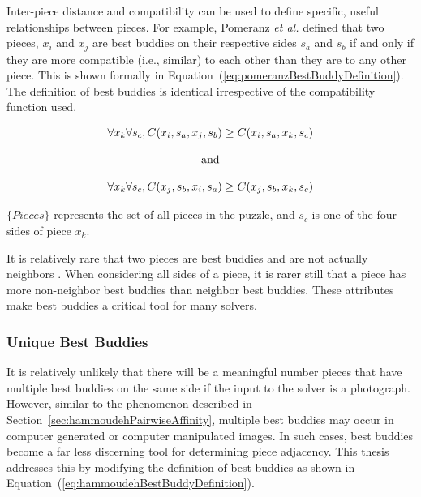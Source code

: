\documentclass{report}
\def\eref#1{(\ref{#1})}
\begin{document}
Inter-piece distance and compatibility can be used to define specific, useful relationships between pieces.  For example, Pomeranz \textit{et al.} defined that two pieces, $x_i$ and $x_j$ are best buddies on their respective sides $s_a$ and $s_b$ if and only if they are more compatible (i.e., similar) to each other than they are to any other piece.  This is shown formally in Equation~\eref{eq:pomeranzBestBuddyDefinition}.  The definition of best buddies is identical irrespective of the compatibility function used.

\begin{equation} \label{eq:pomeranzBestBuddyDefinition}
\centering
\begin{split}
	\begin{matrix}
		\forall{x_{k}}\forall{s_c},C(x_i, s_a, x_j, s_b) \geq C(x_i, s_a, x_k, s_c)
		\\
		\\
		\textnormal{and}
		\\
		\\
		\forall{x_{k}}\forall{s_c},C(x_j, s_b, x_i, s_a) \geq C(x_j, s_b, x_k, s_c)
	\end{matrix}
\end{split}
\end{equation}

\noindent
$\{Pieces\}$ represents the set of all pieces in the puzzle, and $s_c$ is one of the four sides of piece $x_k$.

It is relatively rare that two pieces are best buddies and are not actually neighbors \cite{paikin2015}.  When considering all sides of a piece, it is rarer still that a piece has more non-neighbor best buddies than neighbor best buddies.  These attributes make best buddies a critical tool for many solvers.

\subsubsection{Unique Best Buddies}\label{sec:improvedBestBuddies}

It is relatively unlikely that there will be a meaningful number pieces that have multiple best buddies on the same side if the input to the solver is a photograph.  However, similar to the phenomenon described in Section~\ref{sec:hammoudehPairwiseAffinity}, multiple best buddies may occur in computer generated or computer manipulated images.  In such cases, best buddies become a far less discerning tool for determining piece adjacency.  This thesis addresses this by modifying the definition of best buddies as shown in Equation~\eref{eq:hammoudehBestBuddyDefinition}.
\end{document}
